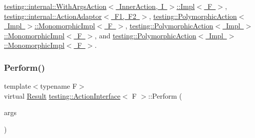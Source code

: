 \mbox{\hyperlink{classtesting_1_1internal_1_1_with_args_action_1_1_impl_a4b01eaaab6fc8dab3cec31991cf79766}{testing\+::internal\+::\+With\+Args\+Action$<$ Inner\+Action, I $>$\+::\+Impl$<$ F $>$}}, \mbox{\hyperlink{classtesting_1_1internal_1_1_action_adaptor_a8d8a47a31f068cf6e0c95b91605d5540}{testing\+::internal\+::\+Action\+Adaptor$<$ F1, F2 $>$}}, \mbox{\hyperlink{classtesting_1_1_polymorphic_action_1_1_monomorphic_impl_af657293ae1ac638802c0fd2486ee5f5b}{testing\+::\+Polymorphic\+Action$<$ Impl $>$\+::\+Monomorphic\+Impl$<$ F $>$}}, \mbox{\hyperlink{classtesting_1_1_polymorphic_action_1_1_monomorphic_impl_ae532b81e7689e0677d64c81f500f3c15}{testing\+::\+Polymorphic\+Action$<$ Impl $>$\+::\+Monomorphic\+Impl$<$ F $>$}}, and \mbox{\hyperlink{classtesting_1_1_polymorphic_action_1_1_monomorphic_impl_ae532b81e7689e0677d64c81f500f3c15}{testing\+::\+Polymorphic\+Action$<$ Impl $>$\+::\+Monomorphic\+Impl$<$ F $>$}}.

\mbox{\label{classtesting_1_1_action_interface_a20f8624fcea1786f2992b358760422a0}} 
\subsubsection{\texorpdfstring{Perform()}{Perform()}\hspace{0.1cm}{\footnotesize\ttfamily [2/3]}}
{\footnotesize\ttfamily template$<$typename F$>$ \\
virtual \mbox{\hyperlink{classtesting_1_1_action_interface_a7477de2fe3e4e01c59db698203acaee7}{Result}} \mbox{\hyperlink{classtesting_1_1_action_interface}{testing\+::\+Action\+Interface}}$<$ F $>$\+::Perform (\begin{DoxyParamCaption}\item[{const \mbox{\hyperlink{classtesting_1_1_action_interface_af72720d864da4d606629e83edc003511}{Argument\+Tuple}} \&}]{args }\end{DoxyParamCaption})\hspace{0.3cm}{\ttfamily [pure virtual]}}



